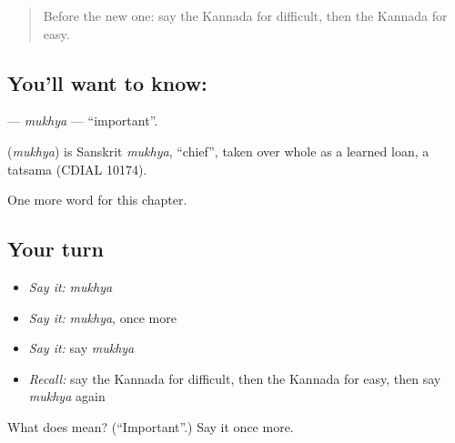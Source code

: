 \begin{quote}
Before the new one: say the Kannada for difficult, then the Kannada for easy.
\end{quote}

\subsection*{You'll want to know: }
\textbf{} — \emph{mukhya} — \textquotedblleft{}important\textquotedblright{}.

\begin{cousinweb}
\textbf{} (\emph{mukhya}) is Sanskrit \emph{mukhya}, \textquotedblleft{}chief\textquotedblright{}, taken over whole as a learned loan, a tatsama (CDIAL 10174).
\end{cousinweb}

\begin{grammarlens}[title={What you've built}]
One more word for this chapter.
\end{grammarlens}

\subsection*{Your turn}
\begin{itemize}
\raggedright
  \item \emph{Say it:} \emph{mukhya}
  \item \emph{Say it:} \emph{mukhya}, once more
  \item \emph{Say it:} say \emph{mukhya}
  \item \emph{Recall:} say the Kannada for difficult, then the Kannada for easy, then say \emph{mukhya} again
\end{itemize}

\begin{tcolorbox}[breakable,colback=teal!4,colframe=teal!35!black,title={Before you move on}]
What does  mean? (\textquotedblleft{}Important\textquotedblright{}.) Say it once more.
\end{tcolorbox}
